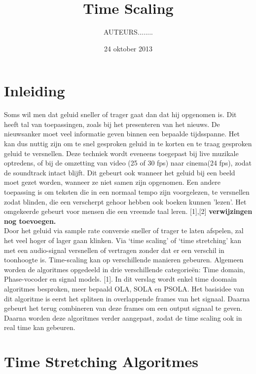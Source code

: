 \documentclass[12pt]{report}
\begin{document}
\title{{\Huge \textbf{Time Scaling}}}
\date{24 oktober 2013}
\author{AUTEURS........}
\maketitle

\tableofcontents

\chapter{Inleiding}
Soms wil men dat geluid sneller of trager gaat dan dat hij opgenomen is. Dit heeft tal van toepassingen, zoals bij het presenteren van het nieuws. De nieuwsanker moet veel informatie geven binnen een bepaalde tijdsspanne. Het kan dus nuttig zijn om te snel gesproken geluid in te korten en te traag gesproken geluid te versnellen. Deze techniek wordt eveneens toegepast bij live muzikale optredens, of bij de omzetting van video (25 of 30 fps) naar cinema(24 fps), zodat de soundtrack intact blijft. Dit gebeurt ook wanneer het geluid bij een beeld moet gezet worden, wanneer ze niet samen zijn opgenomen. Een andere toepassing is om teksten die in een normaal tempo zijn voorgelezen, te versnellen zodat blinden, die een verscherpt gehoor hebben ook boeken kunnen 'lezen'. Het omgekeerde gebeurt voor mensen die een vreemde taal leren. [1],[2]
\textbf{verwijzingen nog toevoegen.}\\

Door het geluid via sample rate conversie sneller of trager te laten afspelen, zal het veel hoger of lager gaan klinken. Via ‘time scaling’ of ‘time stretching’ kan met een audio-signal versnellen of vertragen zonder dat er een verschil in toonhoogte is. Time-scaling kan op verschillende manieren gebeuren. Algemeen worden de algoritmes opgedeeld in drie verschillende categorie\"{e}n: Time domain, Phase-vocoder en signal models. [1]. In dit verslag wordt enkel time doomain algoritmes besproken, meer bepaald OLA, SOLA en PSOLA. Het basisidee  van dit algoritme is eerst het splitsen in overlappende frames van het signaal. Daarna gebeurt het terug combineren van deze frames om een output signaal te geven. Daarna worden deze algoritmes verder aangepast, zodat de time scaling ook in real time kan gebeuren. 

\chapter{Time Stretching Algoritmes}
\end{document}
